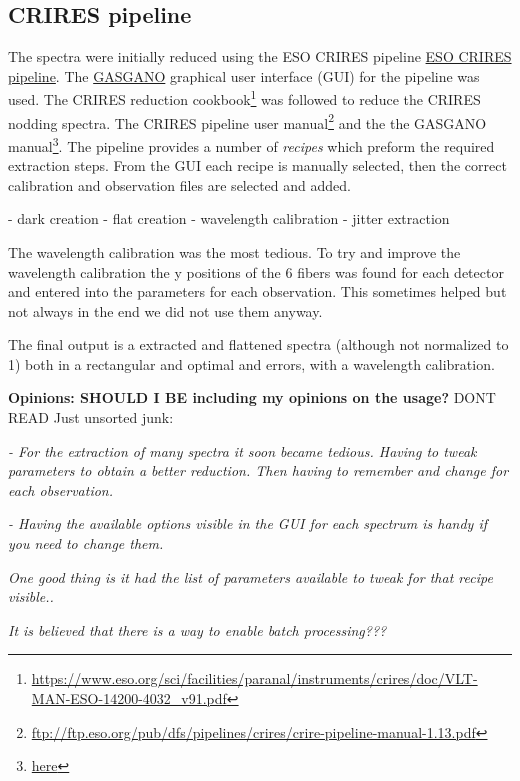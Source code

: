 \subsection{CRIRES pipeline}
The spectra were initially reduced using the ESO CRIRES pipeline \href{ESO CRIRES pipeline}{ESO CRIRES pipeline}. The \href{https://www.eso.org/sci/software/gasgano.html}{GASGANO} graphical user interface (GUI) for the pipeline was used. The CRIRES reduction cookbook\footnote{\href{https://www.eso.org/sci/facilities/paranal/instruments/crires/doc/VLT-MAN-ESO-14200-4032\_v91.pdf}{https://www.eso.org/sci/facilities/paranal/instruments/crires/doc/VLT-MAN-ESO-14200-4032\_v91.pdf}} was followed to reduce the CRIRES nodding spectra. The CRIRES pipeline user manual\footnote{\href{ftp://ftp.eso.org/pub/dfs/pipelines/crires/crire-pipeline-manual-1.13.pdf}{ftp://ftp.eso.org/pub/dfs/pipelines/crires/crire-pipeline-manual-1.13.pdf}} and the the GASGANO manual\footnote{\href{here}{here}}. The pipeline provides a number of \emph{recipes} which preform the required extraction steps. From the GUI each recipe is manually selected, then the correct calibration and observation files are selected and added. 

- dark creation
- flat creation
- wavelength calibration
- jitter extraction

The wavelength calibration was the most tedious. To try and improve the wavelength calibration the y positions of the 6 \thar fibers was found for each detector and entered into the parameters for each observation. This sometimes helped but not always in the end we did not use them anyway.

The final output is a extracted and flattened spectra (although not normalized to 1) both in a rectangular and optimal and errors, with a wavelength calibration.

\textbf{Opinions: SHOULD I BE including my opinions on the usage?}
DONT READ Just unsorted junk: 

\textit{- For the extraction of many spectra it soon became tedious. Having to tweak parameters to obtain a better reduction. Then having to remember and change for each observation. }

\textit{- Having the available options visible in the GUI for each spectrum is handy if you need to change them.}



\textit{One good thing is it had the list of parameters available to tweak for that recipe visible..}

\textit{It is believed that there is a way to enable batch processing???}

